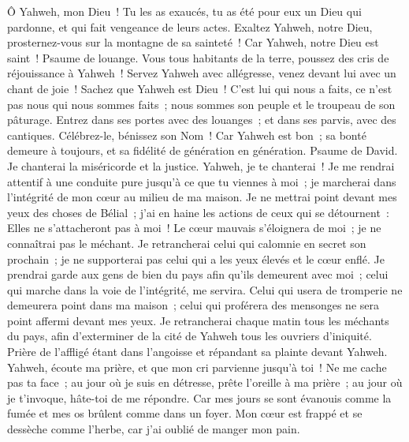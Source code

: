 \begin{multicols}{2}
Ô Yahweh, mon Dieu~! Tu les as exaucés, tu as été pour eux un Dieu qui pardonne, et qui fait vengeance de leurs actes.
Exaltez Yahweh, notre Dieu, prosternez-vous sur la montagne de sa sainteté~! Car Yahweh, notre Dieu est saint~!
\VerseOne{}Psaume de louange. Vous tous habitants de la terre, poussez des cris de réjouissance à Yahweh~!
Servez Yahweh avec allégresse, venez devant lui avec un chant de joie~!
Sachez que Yahweh est Dieu~! C'est lui qui nous a faits, ce n'est pas nous qui nous sommes faits~; nous sommes son peuple et le troupeau de son pâturage.
Entrez dans ses portes avec des louanges~; et dans ses parvis, avec des cantiques. Célébrez-le, bénissez son Nom~!
Car Yahweh est bon~; sa bonté demeure à toujours, et sa fidélité de génération en génération.
\VerseOne{}Psaume de David. Je chanterai la miséricorde et la justice. Yahweh, je te chanterai~!
Je me rendrai attentif à une conduite pure jusqu'à ce que tu viennes à moi~; je marcherai dans l'intégrité de mon cœur au milieu de ma maison.
Je ne mettrai point devant mes yeux des choses de Bélial~; j'ai en haine les actions de ceux qui se détournent~: Elles ne s'attacheront pas à moi~!
Le cœur mauvais s'éloignera de moi~; je ne connaîtrai pas le méchant.
Je retrancherai celui qui calomnie en secret son prochain~; je ne supporterai pas celui qui a les yeux élevés et le cœur enflé.
Je prendrai garde aux gens de bien du pays afin qu'ils demeurent avec moi~; celui qui marche dans la voie de l'intégrité, me servira.
Celui qui usera de tromperie ne demeurera point dans ma maison~; celui qui proférera des mensonges ne sera point affermi devant mes yeux.
Je retrancherai chaque matin tous les méchants du pays, afin d'exterminer de la cité de Yahweh tous les ouvriers d'iniquité.
\VerseOne{}Prière de l'affligé étant dans l'angoisse et répandant sa plainte devant Yahweh.
Yahweh, écoute ma prière, et que mon cri parvienne jusqu'à toi~!
Ne me cache pas ta face~; au jour où je suis en détresse, prête l'oreille à ma prière~; au jour où je t'invoque, hâte-toi de me répondre.
Car mes jours se sont évanouis comme la fumée et mes os brûlent comme dans un foyer.
Mon cœur est frappé et se dessèche comme l'herbe, car j'ai oublié de manger mon pain.

\end{multicols}
